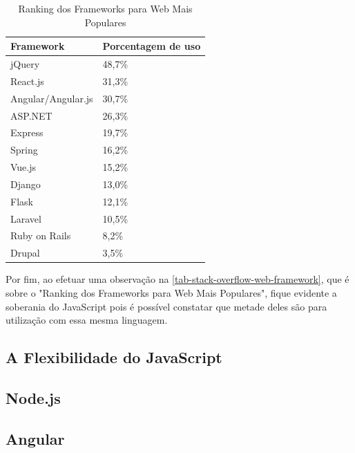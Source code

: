 \begin{table}[htb]
\ABNTEXfontereduzida
\caption[Ranking dos Frameworks para Web Mais Populares]{Ranking dos Frameworks para Web Mais Populares}
\label{tab-stack-overflow-web-framework}
\begin{tabular}{p{5cm}|p{4cm}}
   \textbf{Framework} & \textbf{Porcentagem de uso}  \\
    \hline
    jQuery & 48,7\%  \\
    \hline
    React.js & 31,3\%  \\
    \hline
    Angular/Angular.js & 30,7\%  \\
    \hline
    ASP.NET & 26,3\%  \\
    \hline
    Express & 19,7\%  \\
    \hline
    Spring & 16,2\%  \\
    \hline
    Vue.js & 15,2\%  \\
    \hline
    Django & 13,0\%  \\
    \hline
    Flask & 12,1\%  \\
    \hline
    Laravel & 10,5\%  \\
    \hline
    Ruby on Rails & 8,2\%  \\
    \hline
    Drupal & 3,5\%  \\
\end{tabular}
\end{table}

Por fim, ao efetuar uma observação na \autoref{tab-stack-overflow-web-framework}, que é sobre o "Ranking dos Frameworks para Web Mais Populares", fique evidente a soberania do JavaScript pois é possível constatar que metade deles são para utilização com essa mesma linguagem.

\subsection{A Flexibilidade do JavaScript}

\iffalse
\subsection{Node.js}

\subsection{Angular}

